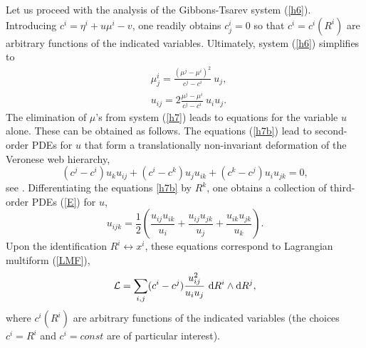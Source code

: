 \documentclass[12pt, a4paper]{article}
\theoremstyle{definition}
\renewcommand{\d}{\mathrm{d}}
\begin{document}
Let us proceed with the analysis of the Gibbons-Tsarev system (\ref{h6}). Introducing $c^i=\eta^i+u\mu^i-v$, one readily obtains $c^i_j=0$ so that $c^i=c^i(R^i)$ are arbitrary functions of the indicated variables. Ultimately, system (\ref{h6}) simplifies to
\begin{subequations}
\label{h7}
\begin{align}
& \mu^i_j=\frac{(\mu^j-\mu^i)^2}{c^j-c^i} \ u_j, \label{h7a}\\
& u_{ij}=2\frac{\mu^j-\mu^i}{c^j-c^i} \ u_iu_j. \label{h7b}
\end{align}
\end{subequations}
The elimination of $\mu$'s from system (\ref{h7}) leads  to  equations for the variable $u$ alone. These can be obtained as follows. The equations (\ref{h7b}) lead to second-order PDEs for $u$ that form a translationally non-invariant deformation of the Veronese web hierarchy,
\begin{equation*}
(c^j-c^i)u_ku_{ij}+(c^i-c^k)u_ju_{ik}+(c^k-c^j)u_iu_{jk}=0,
\end{equation*}
see  \cite{zakharevich2000nonlinear, krynski2016paraconformal, lobb2009lagrangian, kruglikov2017veronese}.  Differentiating the equations \eqref{h7b} by $R^k$, one obtains a collection of third-order PDEs (\ref{E}) for $u$,
\begin{equation*}
u_{ijk}=\frac{1}{2}\left(\frac{u_{ij}u_{ik}}{u_i} +\frac{u_{ij}u_{jk}}{u_j}+\frac{u_{ik}u_{jk}}{u_k}\right).
\end{equation*}
Upon the identification $R^i\leftrightarrow x^i$, these equations correspond to Lagrangian multiform (\ref{LMF}),
\begin{equation*} 
{\cal L}=\sum_{i,j}(c^i-c^j)\frac{u_{ij}^2}{u_iu_j}\ \d R^i\wedge \d R^j,
\end{equation*}
where $c^i(R^i)$ are arbitrary functions of the indicated variables (the choices $c^i=R^i$ and $c^i=const$ are of particular interest).
\end{document}
